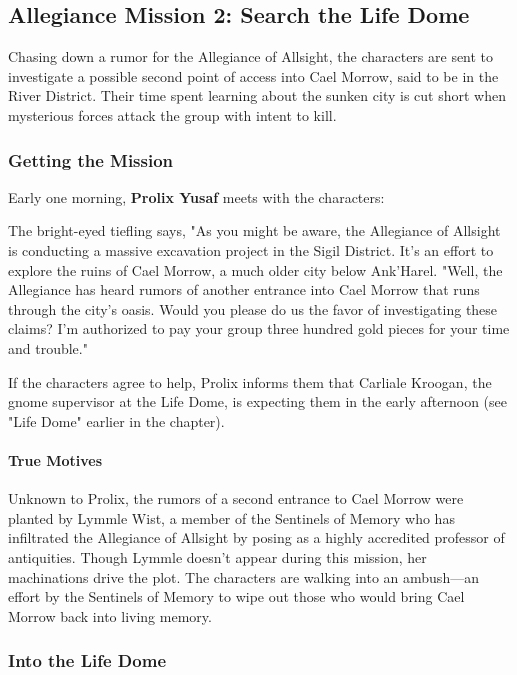 \documentclass[letterpaper, 11pt, bg=full, twocolumn]{dndbook}
\begin{document}
\subsection{Allegiance Mission 2: Search the Life Dome}

Chasing down a rumor for the Allegiance of Allsight, the characters are sent to investigate a possible second point of access into Cael Morrow, said to be in the River District. Their time spent learning about the sunken city is cut short when mysterious forces attack the group with intent to kill.

\subsubsection{Getting the Mission}

Early one morning, \textbf{Prolix Yusaf} meets with the characters:

\begin{DndReadAloud}
The bright-eyed tiefling says, "As you might be aware, the Allegiance of Allsight is conducting a massive excavation project in the Sigil District. It's an effort to explore the ruins of Cael Morrow, a much older city below Ank'Harel.
"Well, the Allegiance has heard rumors of another entrance into Cael Morrow that runs through the city's oasis. Would you please do us the favor of investigating these claims? I'm authorized to pay your group three hundred gold pieces for your time and trouble."
\end{DndReadAloud}

If the characters agree to help, Prolix informs them that Carliale Kroogan, the gnome supervisor at the Life Dome, is expecting them in the early afternoon (see "Life Dome" earlier in the chapter).

\paragraph{True Motives}

Unknown to Prolix, the rumors of a second entrance to Cael Morrow were planted by Lymmle Wist, a member of the Sentinels of Memory who has infiltrated the Allegiance of Allsight by posing as a highly accredited professor of antiquities. Though Lymmle doesn't appear during this mission, her machinations drive the plot. The characters are walking into an ambush---an effort by the Sentinels of Memory to wipe out those who would bring Cael Morrow back into living memory.

\subsubsection{Into the Life Dome}
\end{document}
